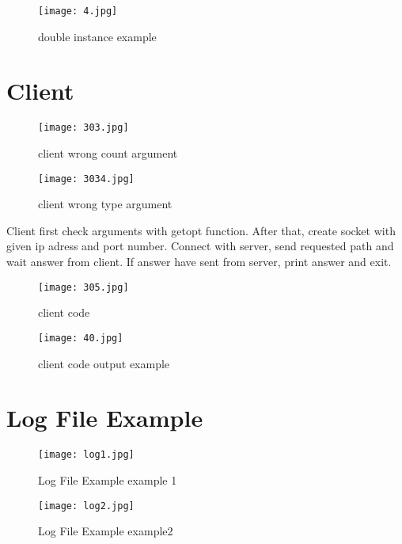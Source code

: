 \documentclass{article}
\begin{document}
\begin{figure}[h!] 
    \centering
    \texttt{[image: 4.jpg]}
    \caption{double instance example}
\end{figure}

\section{Client}
\begin{figure}[h!] 
    \centering
    \texttt{[image: 303.jpg]}
    \caption{client wrong count argument}
\end{figure}
\newpage
\begin{figure}[h!] 
    \centering
    \texttt{[image: 3034.jpg]}
    \caption{client wrong type argument}
\end{figure}

Client first check arguments with getopt function. After that, create socket with given ip adress and port number. Connect with server, send requested path and wait answer from client. If answer have sent from server, print answer and exit.
\begin{figure}[h!] 
    \centering
    \texttt{[image: 305.jpg]}
    \caption{client code}
\end{figure}

\begin{figure}[h!] 
    \centering
    \texttt{[image: 40.jpg]}
    \caption{client code output example}
\end{figure}

\newpage
\section{Log File Example}

\begin{figure}[h!] 
    \centering
    \texttt{[image: log1.jpg]}
    \caption{Log File Example example 1}
\end{figure}

\begin{figure}[h!] 
    \centering
    \texttt{[image: log2.jpg]}
    \caption{Log File Example example2}
\end{figure}
\end{document}
